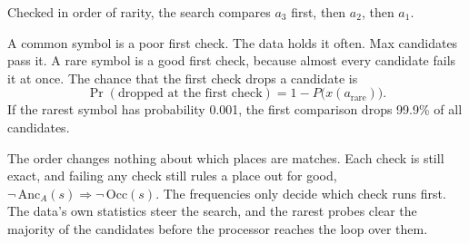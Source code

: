 Checked in order of rarity, the search compares \(a_3\) first, then \(a_2\), then \(a_1\).

A common symbol is a poor first check. The data holds it often. Max candidates pass it. A rare symbol is a good first check, because almost every candidate fails it at once. The chance that the first check drops a candidate is
\[
\Pr(\text{dropped at the first check}) = 1 - P\bigl(x(a_{\text{rare}})\bigr).
\]
If the rarest symbol has probability 0.001, the first comparison drops 99.9\% of all candidates.

The order changes nothing about which places are matches. Each check is still exact, and failing any check still rules a place out for good, \(\neg\,\mathrm{Anc}_A(s) \Rightarrow \neg\,\mathrm{Occ}(s)\). The frequencies only decide which check runs first. The data's own statistics steer the search, and the rarest probes clear the majority of the candidates before the processor reaches the loop over them.
